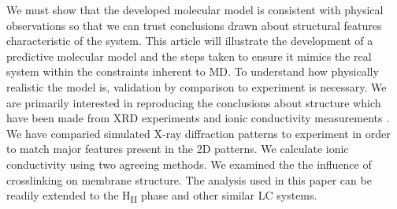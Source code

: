 We must show that the developed molecular model is consistent with
physical observations so that we can trust conclusions drawn about %
structural features characteristic of the system. This article will
illustrate the development of a predictive molecular model and the steps
taken to ensure it mimics the real system within the constraints 
inherent to MD. To understand how physically realistic the model is,
validation by comparison to experiment is necessary. We are primarily
interested in reproducing the conclusions about structure which have been
made from XRD experiments and ionic conductivity measurements
\cite{feng_thin_2016}. We have comparied simulated X-ray diffraction
patterns to experiment in order to match major features present in the
2D patterns. We calculate ionic conductivity using two agreeing methods.
We examined the the influence of crosslinking on
membrane structure. The analysis used in this paper can be readily
extended to the H\textsubscript{II} phase and other similar LC systems.
	
